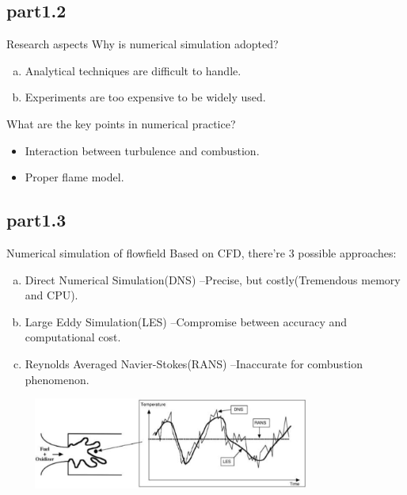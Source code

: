 	\subsection{part1.2}
		\begin{xframe}{Research aspects}
			Why is numerical simulation adopted?
			\begin{enumerate}[(a)]
				\item 
					Analytical techniques are difficult to handle.
				\item
					Experiments are too expensive to be widely used.
			\end{enumerate}
			What are the key points in numerical practice?
			\begin{itemize}
				\item Interaction between turbulence and combustion.
				\item Proper flame model.
			\end{itemize}
		\end{xframe}
	\subsection{part1.3}
		\begin{xframe}{Numerical simulation of flowfield}
			Based on CFD, there're 3 possible approaches:
			\begin{enumerate}[(a)]
				\item{Direct Numerical Simulation(DNS)}\newline
					--Precise, but costly(Tremendous memory and CPU). \XSolid
				\item Large Eddy Simulation(LES)\newline
					--Compromise between accuracy and computational cost. \Checkmark
				\item Reynolds Averaged Navier-Stokes(RANS)\newline
					--Inaccurate for combustion phenomenon. \XSolid
			\end{enumerate}
			\includegraphics[width=11cm, height=3cm]{../pic/comparision.png}
		\end{xframe}
